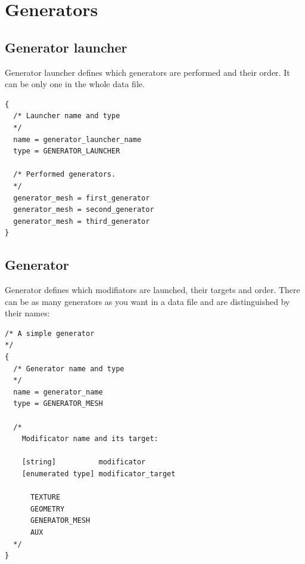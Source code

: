 \documentclass[9pt]{article}
\begin{document}
\section{Generators}

\subsection{Generator launcher}
Generator launcher defines which generators are performed and their order. 
It can be only one in the whole data file.
\begin{verbatim}
{
  /* Launcher name and type
  */
  name = generator_launcher_name
  type = GENERATOR_LAUNCHER

  /* Performed generators. 
  */
  generator_mesh = first_generator
  generator_mesh = second_generator
  generator_mesh = third_generator
}
\end{verbatim}

\subsection{Generator}
Generator defines which modifiators are launched, their targets and order. 
There can be as many generators as you want in a data file and 
are distinguished by their names:
\begin{verbatim}
/* A simple generator
*/
{
  /* Generator name and type
  */
  name = generator_name
  type = GENERATOR_MESH

  /*
    Modificator name and its target:
    
    [string]          modificator
    [enumerated type] modificator_target
      
      TEXTURE
      GEOMETRY
      GENERATOR_MESH
      AUX
  */
}
\end{verbatim}
\end{document}
